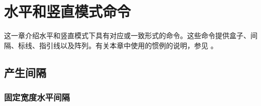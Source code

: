 %


\chapter {水平和竖直模式命令}


这一章介绍水平和竖直模式下具有对应或一致形式的命令。这些命令提供盒子、间隔、标线、指引线以及阵列。有关本章中使用的惯例的说明，参见 。

\begindescriptions

\section {产生间隔}


\subsection {固定宽度水平间隔}

